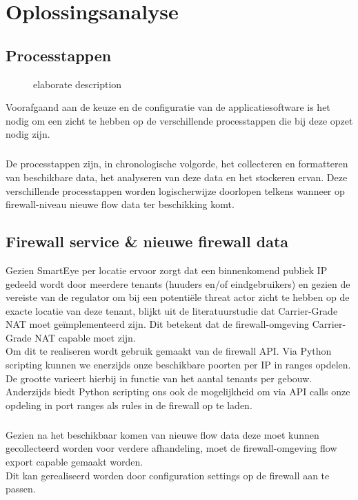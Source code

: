 \chapter{Oplossingsanalyse}
\section{Processtappen}

\begin{figure}[H]
    
    \caption[short description]{elaborate description}
    \label{fig:Oplossingsvoorstel}
\end{figure}

Voorafgaand aan de keuze en de configuratie van de applicatiesoftware is het nodig om een zicht te hebben op de verschillende processtappen die bij deze opzet nodig zijn.

\paragraph{}
De processtappen zijn, in chronologische volgorde, het collecteren en formatteren van beschikbare data, het analyseren van deze data en het stockeren ervan. Deze verschillende processtappen worden logischerwijze doorlopen telkens wanneer op firewall-niveau nieuwe flow data ter beschikking komt.

\section{Firewall service \& nieuwe firewall data}
Gezien SmartEye per locatie ervoor zorgt dat een binnenkomend publiek IP gedeeld wordt door meerdere tenants (huuders en/of eindgebruikers) en gezien de vereiste van de regulator om bij een potentiële threat actor zicht te hebben op de exacte locatie van deze tenant, blijkt uit de literatuurstudie dat Carrier-Grade NAT moet geïmplementeerd zijn. Dit betekent dat de firewall-omgeving Carrier-Grade NAT capable moet zijn.\\ Om dit te realiseren wordt gebruik gemaakt van de firewall API. Via Python scripting kunnen we enerzijds onze beschikbare poorten per IP in ranges opdelen. De grootte varieert hierbij in functie van het aantal tenants per gebouw. Anderzijds biedt Python scripting ons ook de mogelijkheid om via API calls onze opdeling in port ranges als rules in de firewall op te laden.

\paragraph{}
Gezien na het beschikbaar komen van nieuwe flow data deze moet kunnen gecollecteerd worden voor verdere afhandeling, moet de firewall-omgeving flow export capable gemaakt worden.\\ Dit kan gerealiseerd worden door configuration settings op de firewall aan te passen.

